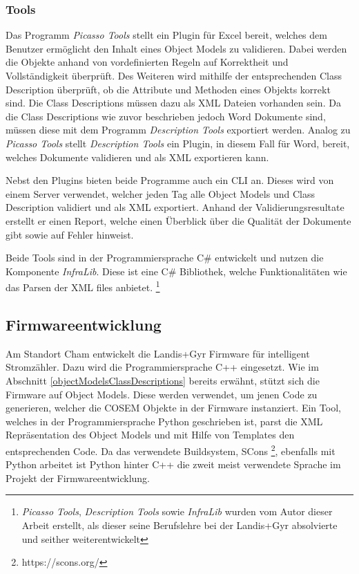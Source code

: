 \subsubsection{Tools}
Das Programm \textit{Picasso Tools} stellt ein Plugin für Excel bereit, welches dem Benutzer ermöglicht den Inhalt eines Object Models zu validieren.
Dabei werden die Objekte anhand von vordefinierten Regeln auf Korrektheit und Vollständigkeit überprüft.
Des Weiteren wird mithilfe der entsprechenden Class Description überprüft, ob die Attribute und Methoden eines Objekts korrekt sind.
Die Class Descriptions müssen dazu als XML Dateien vorhanden sein.
Da die Class Descriptions wie zuvor beschrieben jedoch Word Dokumente sind, müssen diese mit dem Programm \textit{Description Tools} exportiert werden.
Analog zu \textit{Picasso Tools} stellt \textit{Description Tools} ein Plugin, in diesem Fall für Word, bereit, welches Dokumente validieren und als XML exportieren kann.

Nebst den Plugins bieten beide Programme auch ein \ac{CLI} an.
Dieses wird von einem Server verwendet, welcher jeden Tag alle Object Models und Class Description validiert und als XML exportiert.
Anhand der Validierungsresultate erstellt er einen Report, welche einen Überblick über die Qualität der Dokumente gibt sowie auf Fehler hinweist.

Beide Tools sind in der Programmiersprache C\# entwickelt und nutzen die Komponente \textit{InfraLib}.
Diese ist eine C\# Bibliothek, welche Funktionalitäten wie das Parsen der XML files anbietet. 
\footnote{\textit{Picasso Tools}, \textit{Description Tools} sowie \textit{InfraLib} wurden vom Autor dieser Arbeit erstellt, als dieser seine Berufslehre bei der Landis+Gyr absolvierte und seither weiterentwickelt }

\subsection{Firmwareentwicklung}\label{fwEntwicklung}
Am Standort Cham entwickelt die Landis+Gyr Firmware für intelligent Stromzähler.
Dazu wird die Programmiersprache C++ eingesetzt.
Wie im Abschnitt \ref{objectModelsClassDescriptions} bereits erwähnt, stützt sich die Firmware auf Object Models.
Diese werden verwendet, um jenen Code zu generieren, welcher die \ac{COSEM} Objekte in der Firmware instanziert.
Ein Tool, welches in der Programmiersprache Python geschrieben ist, parst die XML Repräsentation des Object Models und mit Hilfe von Templates den entsprechenden Code.
Da das verwendete Buildsystem, SCons \footnote{https://scons.org/}, ebenfalls mit Python arbeitet ist Python hinter C++ die zweit meist verwendete Sprache im Projekt der Firmwareentwicklung.

